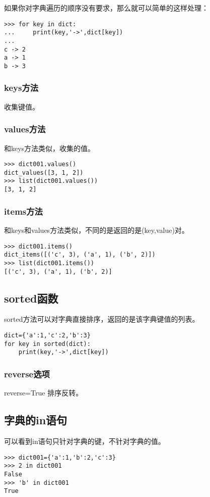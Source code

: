 \documentclass[12pt,oneside]{book}
\begin{document}
\begin{common-format}
如果你对字典遍历的顺序没有要求，那么就可以简单的这样处理：
\begin{Verbatim}
>>> for key in dict:
...     print(key,'->',dict[key])
... 
c -> 2
a -> 1
b -> 3
\end{Verbatim}

\subsubsection{keys方法}
收集键值。

\subsubsection{values方法}
和keys方法类似，收集的值。
\begin{Verbatim}
>>> dict001.values()
dict_values([3, 1, 2])
>>> list(dict001.values())
[3, 1, 2]
\end{Verbatim}

\subsubsection{items方法}
和keys和values方法类似，不同的是返回的是(key,value)对。
\begin{Verbatim}
>>> dict001.items()
dict_items([('c', 3), ('a', 1), ('b', 2)])
>>> list(dict001.items())
[('c', 3), ('a', 1), ('b', 2)]
\end{Verbatim}

\subsection{sorted函数}
sorted方法可以对字典直接排序，返回的是该字典键值的列表。
\begin{Verbatim}
dict={'a':1,'c':2,'b':3}
for key in sorted(dict):
    print(key,'->',dict[key])
\end{Verbatim}


\subsubsection{reverse选项}
reverse=True  排序反转。







\subsection{字典的in语句}
可以看到in语句只针对字典的键，不针对字典的值。
\begin{Verbatim}
>>> dict001={'a':1,'b':2,'c':3}
>>> 2 in dict001
False
>>> 'b' in dict001
True
\end{Verbatim}


\end{common-format}
\end{document}
